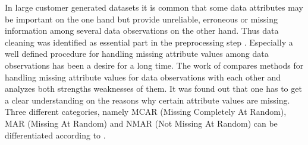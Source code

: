 In large customer generated datasets it is common that some data attributes may be important on the one hand but provide unreliable, erroneous or missing information among several data observations on the other hand. Thus data cleaning was identified as essential part in the preprocessing step \cite{fayyad1996data}. Especially a well defined procedure for handling missing attribute values among data observations has been a desire for a long time. The work of \cite{batista2003analysis} compares methods for handling missing attribute values for data observations with each other and analyzes both strengths weaknesses of them. It was found out that one has to get a clear understanding on the reasons why certain attribute values are missing. Three different categories, namely MCAR (Missing Completely At Random), MAR (Missing At Random) and NMAR (Not Missing At Random) can be differentiated according to \cite{little2014statistical}. 

